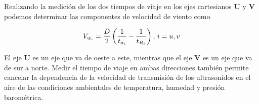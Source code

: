 Realizando la medición de los dos tiempos de viaje en los ejes cartesianos $\mathbf{U}$ y $\mathbf{V}$ podemos determinar las componentes de velocidad de viento como 


\begin{equation}
  \centering
  V_{w_{i}} = \frac{D}{2}\left(\frac{1}{t_{a_{i}}}-\frac{1}{t_{R_{i}}}\right)\text{,  } i= u,v
  \label{eq:velViento}
\end{equation}

El eje $\mathbf{U}$ es un eje que va de oeste a este, mientras que el eje $\mathbf{V}$ es un eje que va de sur a norte. Medir el tiempo de viaje en ambas direcciones también permite cancelar la dependencia de la velocidad de transmisión de los ultrasonidos en el aire de las condiciones ambientales de temperatura, humedad y presión barométrica.



